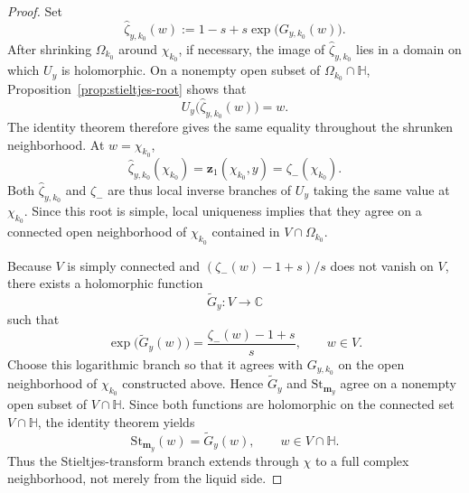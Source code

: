 \documentclass[11pt]{amsart}
\theoremstyle{plain}
\numberwithin{equation}{section}
\numberwithin{theorem}{section}
\numberwithin{figure}{section}
\begin{document}
\begin{proof}
Set
\[
    \widehat\zeta_{y,k_0}(w)
    :=
    1-s+s\exp\bigl(G_{y,k_0}(w)\bigr).
\]
After shrinking \(\Omega_{k_0}\) around \(\chi_{k_0}\), if necessary, the
image of \(\widehat\zeta_{y,k_0}\) lies in a domain on which \(U_y\) is
holomorphic. On a nonempty open subset of
\(\Omega_{k_0}\cap\mathbb H\), Proposition~\ref{prop:stieltjes-root}
shows that
\[
    U_y\bigl(\widehat\zeta_{y,k_0}(w)\bigr)=w.
\]
The identity theorem therefore gives the same equality throughout the
shrunken neighborhood. At \(w=\chi_{k_0}\),
\[
    \widehat\zeta_{y,k_0}(\chi_{k_0})
    =\mathbf z_1(\chi_{k_0},y)
    =\zeta_-(\chi_{k_0}).
\]
Both \(\widehat\zeta_{y,k_0}\) and \(\zeta_-\) are thus local inverse
branches of \(U_y\) taking the same value at \(\chi_{k_0}\). Since this root
is simple, local uniqueness implies that they agree on a connected open
neighborhood of \(\chi_{k_0}\) contained in
\(V\cap\Omega_{k_0}\).

Because \(V\) is simply connected and
\((\zeta_-(w)-1+s)/s\) does not vanish on \(V\), there exists a holomorphic
function
\[
    \widetilde G_y:V\longrightarrow\mathbb C
\]
such that
\[
    \exp\bigl(\widetilde G_y(w)\bigr)
    =
    \frac{\zeta_-(w)-1+s}{s},
    \qquad w\in V.
\]
Choose this logarithmic branch so that it agrees with \(G_{y,k_0}\) on the
open neighborhood of \(\chi_{k_0}\) constructed above. Hence
\(\widetilde G_y\) and \(\mathrm{St}_{\mathbf m_y}\) agree on a nonempty
open subset of \(V\cap\mathbb H\). Since both functions are holomorphic on
the connected set \(V\cap\mathbb H\), the identity theorem yields
\[
    \mathrm{St}_{\mathbf m_y}(w)=\widetilde G_y(w),
    \qquad w\in V\cap\mathbb H.
\]
Thus the Stieltjes-transform branch extends through \(\chi\) to a full
complex neighborhood, not merely from the liquid side.


\end{proof}
\end{document}
